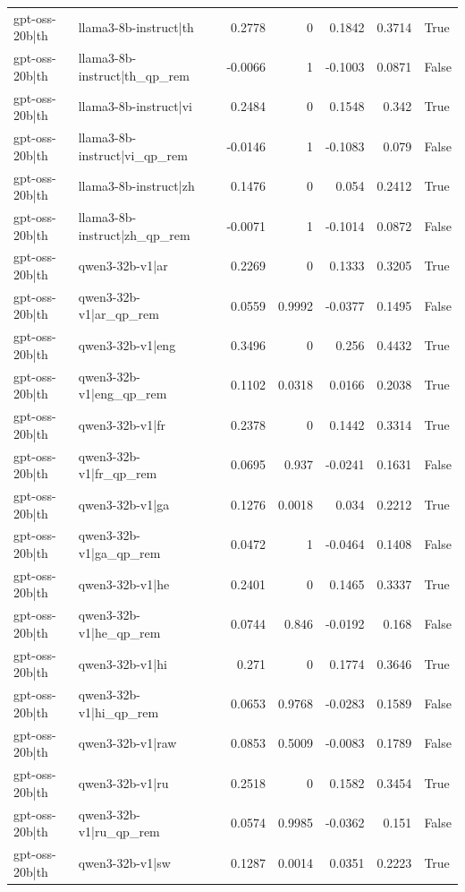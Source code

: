 \begin{table}
\begin{tabular}{l l r r r r l}
gpt-oss-20b|th & llama3-8b-instruct|th & 0.2778 & 0 & 0.1842 & 0.3714 & True \\
gpt-oss-20b|th & llama3-8b-instruct|th_qp_rem & -0.0066 & 1 & -0.1003 & 0.0871 & False \\
gpt-oss-20b|th & llama3-8b-instruct|vi & 0.2484 & 0 & 0.1548 & 0.342 & True \\
gpt-oss-20b|th & llama3-8b-instruct|vi_qp_rem & -0.0146 & 1 & -0.1083 & 0.079 & False \\
gpt-oss-20b|th & llama3-8b-instruct|zh & 0.1476 & 0 & 0.054 & 0.2412 & True \\
gpt-oss-20b|th & llama3-8b-instruct|zh_qp_rem & -0.0071 & 1 & -0.1014 & 0.0872 & False \\
gpt-oss-20b|th & qwen3-32b-v1|ar & 0.2269 & 0 & 0.1333 & 0.3205 & True \\
gpt-oss-20b|th & qwen3-32b-v1|ar_qp_rem & 0.0559 & 0.9992 & -0.0377 & 0.1495 & False \\
gpt-oss-20b|th & qwen3-32b-v1|eng & 0.3496 & 0 & 0.256 & 0.4432 & True \\
gpt-oss-20b|th & qwen3-32b-v1|eng_qp_rem & 0.1102 & 0.0318 & 0.0166 & 0.2038 & True \\
gpt-oss-20b|th & qwen3-32b-v1|fr & 0.2378 & 0 & 0.1442 & 0.3314 & True \\
gpt-oss-20b|th & qwen3-32b-v1|fr_qp_rem & 0.0695 & 0.937 & -0.0241 & 0.1631 & False \\
gpt-oss-20b|th & qwen3-32b-v1|ga & 0.1276 & 0.0018 & 0.034 & 0.2212 & True \\
gpt-oss-20b|th & qwen3-32b-v1|ga_qp_rem & 0.0472 & 1 & -0.0464 & 0.1408 & False \\
gpt-oss-20b|th & qwen3-32b-v1|he & 0.2401 & 0 & 0.1465 & 0.3337 & True \\
gpt-oss-20b|th & qwen3-32b-v1|he_qp_rem & 0.0744 & 0.846 & -0.0192 & 0.168 & False \\
gpt-oss-20b|th & qwen3-32b-v1|hi & 0.271 & 0 & 0.1774 & 0.3646 & True \\
gpt-oss-20b|th & qwen3-32b-v1|hi_qp_rem & 0.0653 & 0.9768 & -0.0283 & 0.1589 & False \\
gpt-oss-20b|th & qwen3-32b-v1|raw & 0.0853 & 0.5009 & -0.0083 & 0.1789 & False \\
gpt-oss-20b|th & qwen3-32b-v1|ru & 0.2518 & 0 & 0.1582 & 0.3454 & True \\
gpt-oss-20b|th & qwen3-32b-v1|ru_qp_rem & 0.0574 & 0.9985 & -0.0362 & 0.151 & False \\
gpt-oss-20b|th & qwen3-32b-v1|sw & 0.1287 & 0.0014 & 0.0351 & 0.2223 & True \\

\end{tabular}
\end{table}
